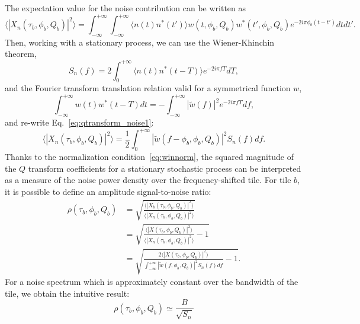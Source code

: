 The expectation value for the noise contribution can be written as
\begin{equation}
  \langle |X_n(\tau_b, \phi_b, Q_b)|^2 \rangle =  \int_{-\infty}^{+\infty}{ \int_{-\infty}^{+\infty}{ \langle n(t)n^*(t') \rangle w(t,\phi_b,Q_b) w^*(t',\phi_b,Q_b) e^{-2i\pi\phi_b(t-t')}dt}dt'}.
  \label{eq:qtransform_noise1}
\end{equation}
Then, working with a stationary process, we can use the Wiener-Khinchin theorem,
\begin{equation}
  S_n(f)=2\int_{0}^{+\infty}{ \langle n(t)n^*(t-T) \rangle e^{-2i\pi fT}dT},
\end{equation}
and the Fourier transform translation relation valid for a symmetrical function $w$,
\begin{equation}
  \int_{-\infty}^{+\infty}{w(t)w^*(t-T)dt} = -\int_{-\infty}^{+\infty}{|\tilde{w}(f)|^2e^{-2i\pi fT}df},
\end{equation}
and re-write Eq.~\ref{eq:qtransform_noise1}:
\begin{equation}
  \langle |X_n(\tau_b, \phi_b, Q_b)|^2 \rangle =  \frac{1}{2}\int_{0}^{+\infty}{ |\tilde{w}(f-\phi_b,\phi_b,Q_b)|^2S_n(f) df }.
  \label{eq:qtransform_noise}
\end{equation}
Thanks to the normalization condition~\ref{eq:winnorm}, the squared magnitude of the $Q$ transform coefficients for a stationary stochastic process can be interpreted as a measure of the noise power density over the frequency-shifted tile.
For tile $b$, it is possible to define an amplitude signal-to-noise ratio:
\begin{align}
  \rho(\tau_b, \phi_b, Q_b) &=  \sqrt{\frac{\langle|X_b(\tau_b, \phi_b, Q_b)|^2\rangle}{\langle |X_n(\tau_b, \phi_b, Q_b)|^2\rangle}} \label{eq:snr1} \\
  &=  \sqrt{\frac{\langle|X(\tau_b, \phi_b, Q_b)|^2\rangle}{\langle |X_n(\tau_b, \phi_b, Q_b)|^2\rangle}-1} \label{eq:snr2} \\
  &= \sqrt{\frac{2\langle |X(\tau_b, \phi_b, Q_b)|^2 \rangle}{\int_{-\infty}^{+\infty}{ |\tilde{w}(f,\phi_b,Q_b)|^2S_n(f) df}} -1 }\label{eq:snr3}.
\end{align}
For a noise spectrum which is approximately constant over the bandwidth of the tile, we obtain the intuitive result:
\begin{equation}
  \rho(\tau_b, \phi_b, Q_b) \simeq \frac{B}{\sqrt{S_n}}
\end{equation}




